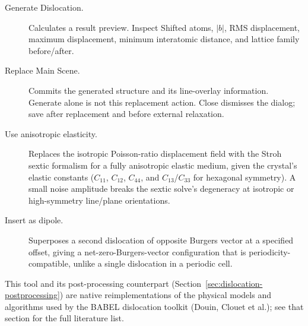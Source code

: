 \begin{description}
\item[Generate Dislocation.] Calculates a result preview. Inspect Shifted atoms, $|b|$, RMS displacement, maximum displacement, minimum interatomic distance, and lattice family before/after.
\item[Replace Main Scene.] Commits the generated structure and its line-overlay information. Generate alone is not this replacement action. Close dismisses the dialog; save after replacement and before external relaxation.
\item[Use anisotropic elasticity.] Replaces the isotropic Poisson-ratio displacement field with the Stroh sextic formalism for a fully anisotropic elastic medium, given the crystal's elastic constants ($C_{11}$, $C_{12}$, $C_{44}$, and $C_{13}$/$C_{33}$ for hexagonal symmetry). A small noise amplitude breaks the sextic solve's degeneracy at isotropic or high-symmetry line/plane orientations.
\item[Insert as dipole.] Superposes a second dislocation of opposite Burgers vector at a specified offset, giving a net-zero-Burgers-vector configuration that is periodicity-compatible, unlike a single dislocation in a periodic cell.
\end{description}
This tool and its post-processing counterpart (Section~\ref{sec:dislocation-postprocessing}) are native reimplementations of the physical models and algorithms used by the BABEL dislocation toolkit (Douin, Clouet et al.); see that section for the full literature list.

